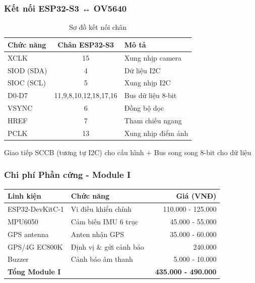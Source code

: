 \begin{frame}
\frametitle{Kết nối ESP32-S3 ↔ OV5640}

\begin{table}[h]
\centering
\caption{Sơ đồ kết nối chân}
\begin{tabular}{|l|c|l|}
\hline
\textbf{Chức năng} & \textbf{Chân ESP32-S3} & \textbf{Mô tả} \\
\hline
XCLK & 15 & Xung nhịp camera \\
SIOD (SDA) & 4 & Dữ liệu I2C \\
SIOC (SCL) & 5 & Xung nhịp I2C \\
D0-D7 & 11,9,8,10,12,18,17,16 & Bus dữ liệu 8-bit \\
VSYNC & 6 & Đồng bộ dọc \\
HREF & 7 & Tham chiếu ngang \\
PCLK & 13 & Xung nhịp điểm ảnh \\
\hline
\end{tabular}
\end{table}

\begin{alertblock}{Giao tiếp}
SCCB (tương tự I2C) cho cấu hình + Bus song song 8-bit cho dữ liệu
\end{alertblock}

\end{frame}

\begin{frame}
\frametitle{Chi phí Phần cứng - Module I}

\begin{table}[h]
\centering
\small
\begin{tabular}{|l|l|r|}
\hline
\textbf{Linh kiện} & \textbf{Chức năng} & \textbf{Giá (VNĐ)} \\
\hline
ESP32-DevKitC-1 & Vi điều khiển chính & 110.000 - 125.000 \\
MPU6050 & Cảm biến IMU 6 trục & 45.000 - 55.000 \\
GPS antenna & Anten nhận GPS & 35.000 - 60.000 \\
GPS/4G EC800K & Định vị \& gửi cảnh báo & ~240.000 \\
Buzzer & Cảnh báo âm thanh & 5.000 - 10.000 \\
\hline
\textbf{Tổng Module I} & & \textbf{~435.000 - 490.000} \\
\hline
\end{tabular}
\end{table}



\end{frame}

